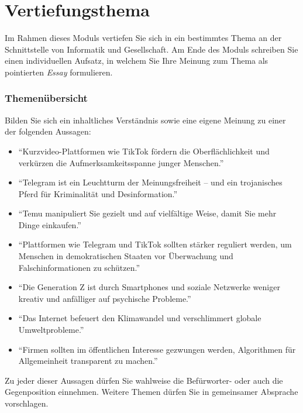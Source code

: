 



\part*{Vertiefungsthema}

Im Rahmen dieses Moduls vertiefen Sie sich in ein bestimmtes Thema an der Schnittstelle von Informatik und Gesellschaft. Am Ende des Moduls schreiben Sie einen individuellen Aufsatz, in welchem Sie Ihre Meinung zum Thema als pointierten \textit{Essay} formulieren.

\section{Themenübersicht}

Bilden Sie sich ein inhaltliches Verständnis sowie eine eigene Meinung zu einer der folgenden Aussagen:

\begin{itemize}
	\item \enquote{Kurzvideo-Plattformen wie TikTok fördern die Oberflächlichkeit und verkürzen die Aufmerksamkeitsspanne junger Menschen.}
	
	\item \enquote{Telegram ist ein Leuchtturm der Meinungsfreiheit -- und ein trojanisches Pferd für Kriminalität und Desinformation.}
	\item \enquote{Temu manipuliert Sie gezielt und auf vielfältige Weise, damit Sie mehr Dinge einkaufen.}
	\item \enquote{Plattformen wie Telegram und TikTok sollten stärker reguliert werden, um Menschen in demokratischen Staaten vor Überwachung und Falschinformationen zu schützen.}
	\item \enquote{Die Generation Z ist durch Smartphones und soziale Netzwerke weniger kreativ und anfälliger auf psychische Probleme.}
	\item \enquote{Das Internet befeuert den Klimawandel und verschlimmert globale Umweltprobleme.}
	\item \enquote{Firmen sollten im öffentlichen Interesse gezwungen werden, Algorithmen für Allgemeinheit transparent zu machen.}
\end{itemize}

Zu jeder dieser Aussagen dürfen Sie wahlweise die Befürworter- oder auch die Gegenposition einnehmen. Weitere Themen dürfen Sie in gemeinsamer Absprache vorschlagen. 

